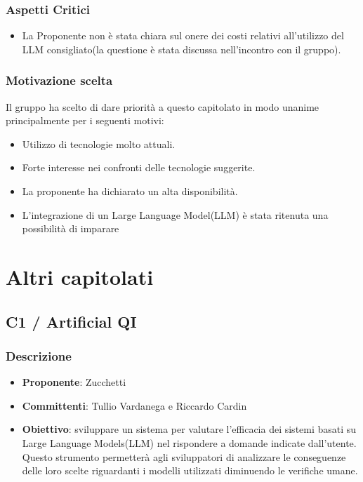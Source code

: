\documentclass[a4paper, 12pt]{article}
\begin{document}
\subsubsection{Aspetti Critici}
\begin{itemize}
    \item La Proponente non è stata chiara sul onere dei costi relativi all’utilizzo del LLM consigliato(la questione è stata discussa nell'incontro con il gruppo).
\end{itemize}

\subsubsection{Motivazione scelta}
Il gruppo ha scelto di dare priorità a questo capitolato in modo unanime principalmente per i seguenti motivi:
\begin{itemize}
    \item Utilizzo di tecnologie molto attuali.
    \item Forte interesse nei confronti delle tecnologie suggerite.
    \item La proponente ha dichiarato un alta disponibilità.
    \item L'integrazione di un Large Language Model(LLM) è stata ritenuta una possibilità di imparare   
\end{itemize}

\section{Altri capitolati}
\subsection{C1 / Artificial QI}
\subsubsection{Descrizione}
\begin{itemize}
    \item \textbf{Proponente}: Zucchetti
    \item \textbf{Committenti}: Tullio Vardanega e Riccardo Cardin
    \item \textbf{Obiettivo}: sviluppare un sistema per valutare l'efficacia dei sistemi basati su Large Language Models(LLM) nel rispondere a domande indicate dall’utente. 
    Questo strumento permetterà agli sviluppatori di analizzare le conseguenze delle loro scelte riguardanti i modelli utilizzati diminuendo le verifiche umane.     
\end{itemize}
\end{document}
